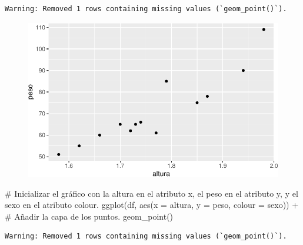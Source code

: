 \documentclass[
  a4paper,
]{scrreport}
\newenvironment{Shaded}{\begin{snugshade}}{\end{snugshade}}
\newcommand{\AttributeTok}[1]{\textcolor[rgb]{0.40,0.45,0.13}{#1}}
\newcommand{\CommentTok}[1]{\textcolor[rgb]{0.37,0.37,0.37}{#1}}
\newcommand{\FunctionTok}[1]{\textcolor[rgb]{0.28,0.35,0.67}{#1}}
\newcommand{\NormalTok}[1]{\textcolor[rgb]{0.00,0.23,0.31}{#1}}
\newcommand{\SpecialCharTok}[1]{\textcolor[rgb]{0.37,0.37,0.37}{#1}}
\theoremstyle{definition}
\theoremstyle{definition}
\theoremstyle{remark}
\begin{document}
\begin{verbatim}
Warning: Removed 1 rows containing missing values (`geom_point()`).
\end{verbatim}

\begin{figure}[H]

{\centering \includegraphics{./07-graficos_files/figure-pdf/unnamed-chunk-4-1.pdf}

}

\end{figure}

\begin{Shaded}
\begin{Highlighting}[]
\CommentTok{\# Inicializar el gráfico con la altura en el atributo x, el peso en el atributo y, y el sexo en el atributo colour.}
\FunctionTok{ggplot}\NormalTok{(df, }\FunctionTok{aes}\NormalTok{(}\AttributeTok{x =}\NormalTok{ altura, }\AttributeTok{y =}\NormalTok{ peso, }\AttributeTok{colour =}\NormalTok{ sexo)) }\SpecialCharTok{+}
\CommentTok{\# Añadir la capa de los puntos.}
    \FunctionTok{geom\_point}\NormalTok{()}
\end{Highlighting}
\end{Shaded}

\begin{verbatim}
Warning: Removed 1 rows containing missing values (`geom_point()`).
\end{verbatim}
\end{document}
